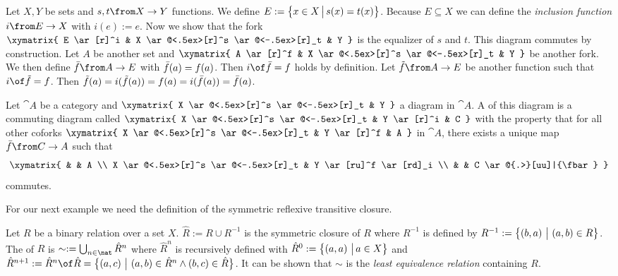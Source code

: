 \begin{example}
  \label{ex:equalizer:solset}
  Let $X, Y$ be sets and $s, t \from X \to Y$ functions.
  We define $E := \bigl \{ x \in X \,\big|\, s(x)=t(x) \bigr \}$.
  Because $E \subseteq X$ we can define the \emph{inclusion function} $i \from E \to X$ with $i(e) := e$.
  Now we show that the fork
  $ \xymatrix{
    E \ar[r]^i & X \ar@<.5ex>[r]^s \ar@<-.5ex>[r]_t & Y
  } $
  is the equalizer of $s$ and $t$. This diagram commutes by construction.
  Let $A$ be another set and
  $ \xymatrix{
    A \ar[r]^f & X \ar@<.5ex>[r]^s \ar@<-.5ex>[r]_t & Y
  } $
  be another fork.
  We then define $\fbar \from A \to E$ with $\bar{f}(a) = f(a)$.
  Then $i \of \fbar = f$ holds by definition.
  Let $\ftilde \from A \to E$ be another function such that $i \of \ftilde = f$.
  Then $\tilde{f}(a) = i (\tilde{f}(a)) = f(a) = i (\bar{f}(a)) = \bar{f}(a)$.
\end{example}


\begin{definition}[Coequalizer]
  \label{def:coequa}
  Let $\cat{A}$ be a category and
  $ \xymatrix{
    X \ar@<.5ex>[r]^s \ar@<-.5ex>[r]_t & Y
  } $
  a diagram in $\cat{A}$.
  A  of this diagram is a commuting diagram called 
  $ \xymatrix{
    X \ar@<.5ex>[r]^s \ar@<-.5ex>[r]_t & Y \ar[r]^i & C
  } $
  with the property that for all other coforks
  $ \xymatrix{
    X \ar@<.5ex>[r]^s \ar@<-.5ex>[r]_t & Y \ar[r]^f & A
  } $
  in $\cat{A}$, there exists a unique map $\fbar\from C \to A$ such that
  \[ \xymatrix{
    & & A  \\
    X \ar@<.5ex>[r]^s \ar@<-.5ex>[r]_t & Y \ar[ru]^f \ar[rd]_i \\
    & & C \ar@{.>}[uu]|{\fbar}
  } \]
  commutes.
\end{definition}

For our next example we need the definition of the symmetric reflexive transitive closure.

\begin{definition}
  \label{def:srtc}
  Let $R$ be a binary relation over a set $X$.
  $\hat{R} := R \cup R^{-1}$ is the symmetric closure of $R$ where $R^{-1}$ is defined by
  $R^{-1} := \bigl \{ \left( b , a \right) \,\big|\, \left( a , b \right) \in R \bigr \}$.
  The  of $R$ is $\sim := \bigcup_{n\in\nat} {\hat R}^n$
  where ${\hat R}^n$ is recursively defined with
  ${\hat R}^0 := \bigl \{ \left( a , a \right) \,\big|\, a \in X \bigr \}$ and
  ${\hat R}^{n+1} := {\hat R}^n \of \hat R = \setMap{\pair{a}{c}}{\pair{a}{b} \in {\hat R}^n \land \pair{b}{c} \in \hat R}$.
  It can be shown that $\sim$ is the \emph{least equivalence relation} containing $R$.
\end{definition}

